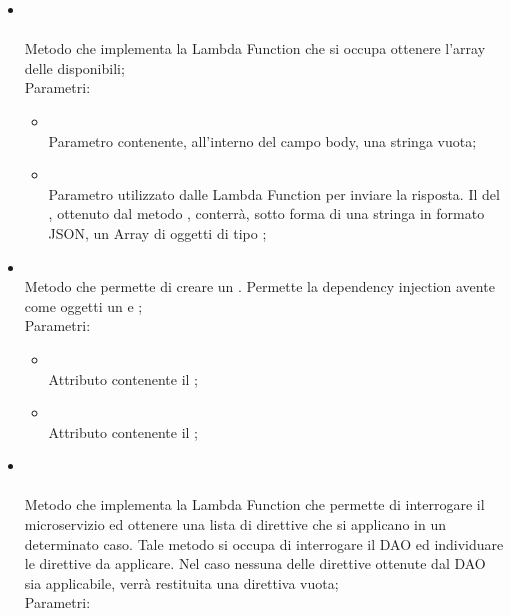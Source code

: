 \begin{itemize}
\begin{itemize}
\begin{itemize}
		\end{itemize}
		\item[]  \\\\		Metodo che implementa la Lambda Function che si occupa ottenere l'array delle  disponibili;\\
		Parametri:
		\begin{itemize}
			\item {} \\
			Parametro contenente, all'interno del campo body, una stringa vuota;
			\item {} \\
			Parametro utilizzato dalle Lambda Function per inviare la risposta. Il  del , ottenuto dal metodo , conterrà, sotto forma di una stringa in formato JSON,  un Array di oggetti di tipo ;
		\end{itemize}
		\item[]  \\		Metodo che permette di creare un . Permette la dependency injection avente come oggetti un  e ;\\
		Parametri:
		\begin{itemize}
			\item {} \\
			Attributo contenente il ;
			\item {} \\
			Attributo contenente il ;
		\end{itemize}
		\item[]  \\\\		Metodo che implementa la Lambda Function che permette di interrogare il microservizio ed ottenere una lista di direttive che si applicano in un determinato caso.
Tale metodo si occupa di interrogare il DAO ed individuare le direttive da applicare. Nel caso nessuna delle direttive ottenute dal DAO sia applicabile, verrà restituita una direttiva vuota;\\
		Parametri:
		\begin{itemize}

\end{itemize}
\end{itemize}
\end{itemize}
